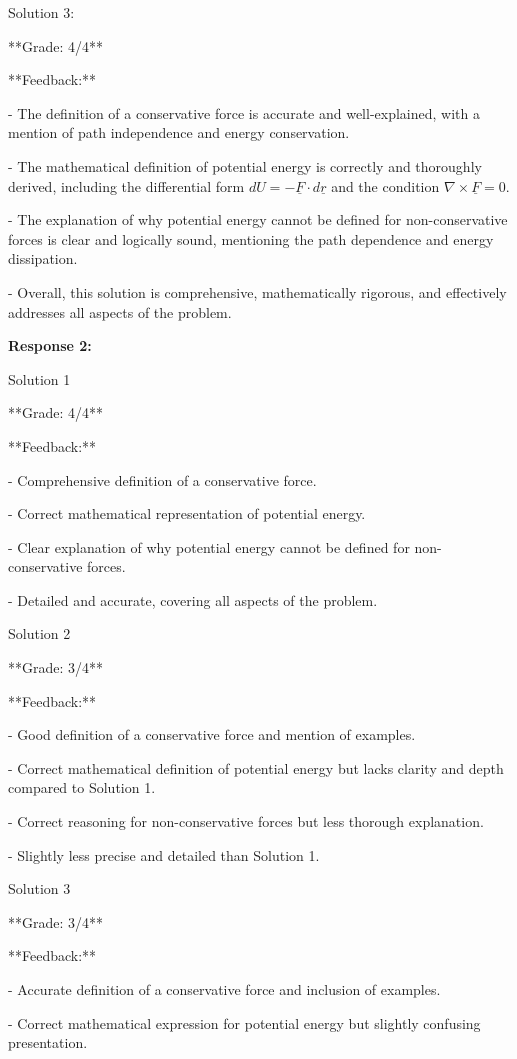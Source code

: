 \documentclass[a4paper,11pt]{article}
\begin{document}
Solution 3:

**Grade: 4/4**

**Feedback:**

- The definition of a conservative force is accurate and well-explained, with a mention of path independence and energy conservation.

- The mathematical definition of potential energy is correctly and thoroughly derived, including the differential form \( dU = -\underline{F} \cdot d\underline{r} \) and the condition \( \nabla \times \underline{F} = 0 \).

- The explanation of why potential energy cannot be defined for non-conservative forces is clear and logically sound, mentioning the path dependence and energy dissipation.

- Overall, this solution is comprehensive, mathematically rigorous, and effectively addresses all aspects of the problem.

\bigskip
\textbf{Response 2:}

Solution 1

**Grade: 4/4**

**Feedback:**

- Comprehensive definition of a conservative force.

- Correct mathematical representation of potential energy.

- Clear explanation of why potential energy cannot be defined for non-conservative forces.

- Detailed and accurate, covering all aspects of the problem.

Solution 2

**Grade: 3/4**

**Feedback:**

- Good definition of a conservative force and mention of examples.

- Correct mathematical definition of potential energy but lacks clarity and depth compared to Solution 1.

- Correct reasoning for non-conservative forces but less thorough explanation.

- Slightly less precise and detailed than Solution 1.

Solution 3

**Grade: 3/4**

**Feedback:**

- Accurate definition of a conservative force and inclusion of examples.

- Correct mathematical expression for potential energy but slightly confusing presentation.
\end{document}
